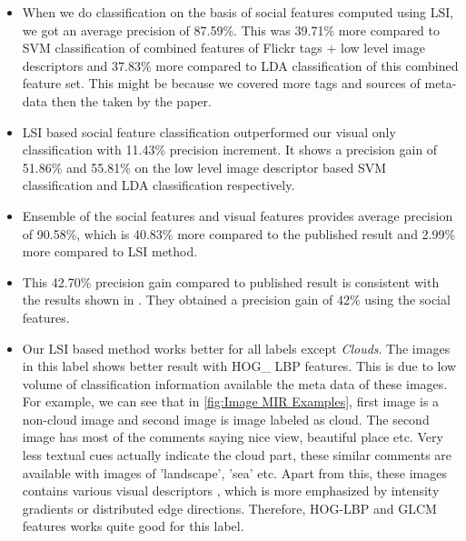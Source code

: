 \begin{itemize}

\item When we do classification on the basis of social features computed using LSI, we got an average precision of 87.59\%. This was 
39.71\% more compared to SVM classification of combined features of Flickr tags $+$ low level image descriptors and  37.83\% more 
compared to LDA classification of this combined feature set. This might be because we covered more tags and sources of meta-data then the taken by the paper.
\item LSI based social feature classification outperformed our visual only classification with 11.43\% precision increment.  It shows a 
precision gain of 51.86\% and 55.81\% on the low level image descriptor based SVM classification and LDA classification respectively.
\item Ensemble of the social features and visual features provides average precision of 90.58\%, which is 40.83\% more compared to the published result and 2.99\% more compared to LSI method.
\item This 42.70\% precision gain compared to published result is consistent with the results shown in \citet{Jure}. They obtained a 
precision gain of 42\% using the social features.
\item Our LSI based method works better for all labels except \textit{Clouds}. The images in this label shows better result with HOG\_ LBP features. This is due to low volume of classification information available the meta data of these images. For example, we can see that in \ref{fig:Image MIR Examples}, first image is a non-cloud image and second image is image labeled as cloud. The second image has most of the comments saying nice view, beautiful place etc. Very less textual cues actually indicate the cloud part, these similar comments are available with images of 'landscape', 'sea' etc. Apart from this, these images contains various visual descriptors , which is more emphasized by intensity gradients or distributed edge directions. Therefore, HOG-LBP and GLCM features works quite good for this label.

\end{itemize}
